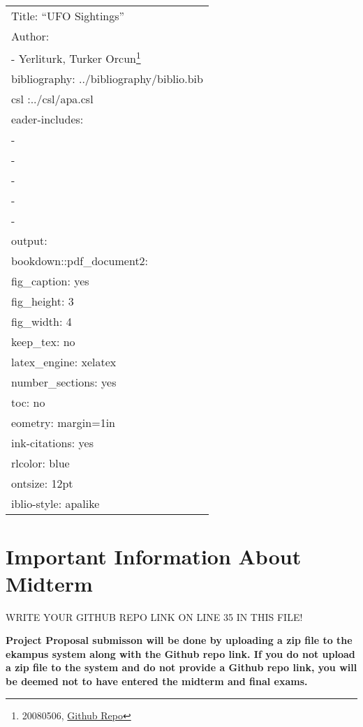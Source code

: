 \documentclass[
]{article}
\author{}
\date{\vspace{-2.5em}}
\begin{document}
{
\setcounter{tocdepth}{2}
\tableofcontents
}
\begin{longtable}[]{@{}l@{}}
\toprule()
\endhead
Title: ``UFO Sightings'' \\
Author: \\
- Yerliturk, Turker Orcun\footnote{20080506, \href{https://github.com/orcunyerliturk/midterm}{Github Repo}} \\
bibliography: ../bibliography/biblio.bib \\
csl :../csl/apa.csl \\
eader-includes: \\
- \\
- \\
- \\
- \\
- \captionsetup[table]{skip=10pt} \\
output: \\
bookdown::pdf\_document2: \\
fig\_caption: yes \\
fig\_height: 3 \\
fig\_width: 4 \\
keep\_tex: no \\
latex\_engine: xelatex \\
number\_sections: yes \\
toc: no \\
eometry: margin=1in \\
ink-citations: yes \\
rlcolor: blue \\
ontsize: 12pt \\
iblio-style: apalike \\
\bottomrule()
\end{longtable}

\hypertarget{important-information-about-midterm}{%
\section{Important Information About Midterm}\label{important-information-about-midterm}}

\colorbox{BurntOrange}{WRITE YOUR GITHUB REPO LINK ON LINE 35 IN THIS FILE!}

\textbf{Project Proposal submisson will be done by uploading a zip file to the ekampus system along with the Github repo link. If you do not upload a zip file to the system and do not provide a Github repo link, you will be deemed not to have entered the midterm and final exams.}
\end{document}

